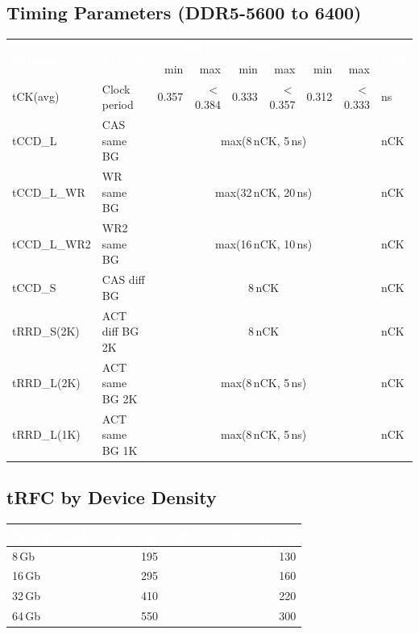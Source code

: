 \documentclass[10pt,a4paper,twoside]{article}
\newcommand{\thd}[1]{\cellcolor{navyblue}\textcolor{white}{\textbf{#1}}}
\newcommand{\thdm}[1]{\cellcolor{steelblue}\textcolor{white}{\small\textbf{#1}}}
\newcommand{\trow}{\rowcolor{lightgray}}
\newcommand{\talt}{\rowcolor{skyblue!30}}
\begin{document}
\subsection{Timing Parameters (DDR5-5600 to 6400)}

\begin{center}
\begin{tabularx}{\linewidth}{@{} l l r r r r r r l @{}}
\toprule
\multirow{2}{*}{\thd{Parameter}} & \multirow{2}{*}{\thd{Symbol}} &
\multicolumn{2}{c}{\thdm{5600}} & \multicolumn{2}{c}{\thdm{6000}} &
\multicolumn{2}{c}{\thdm{6400}} & \multirow{2}{*}{\thd{Unit}} \\
& & min & max & min & max & min & max & \\
\midrule
\trow tCK(avg) & Clock period & 0.357 & $<$0.384 & 0.333 & $<$0.357 & 0.312 & $<$0.333 & ns \\
\talt tCCD\_L & CAS same BG & \multicolumn{6}{c}{max(8\,nCK, 5\,ns)} & nCK \\
\trow tCCD\_L\_WR & WR same BG & \multicolumn{6}{c}{max(32\,nCK, 20\,ns)} & nCK \\
\talt tCCD\_L\_WR2 & WR2 same BG & \multicolumn{6}{c}{max(16\,nCK, 10\,ns)} & nCK \\
\trow tCCD\_S & CAS diff BG & \multicolumn{6}{c}{8\,nCK} & nCK \\
\talt tRRD\_S(2K) & ACT diff BG 2K & \multicolumn{6}{c}{8\,nCK} & nCK \\
\trow tRRD\_L(2K) & ACT same BG 2K & \multicolumn{6}{c}{max(8\,nCK, 5\,ns)} & nCK \\
\talt tRRD\_L(1K) & ACT same BG 1K & \multicolumn{6}{c}{max(8\,nCK, 5\,ns)} & nCK \\
\bottomrule
\end{tabularx}
\end{center}

\subsection{tRFC by Device Density}

\begin{center}
\begin{tabularx}{0.8\linewidth}{@{} l r r @{}}
\toprule
\thd{Density} & \thd{tRFC1 (ns) min} & \thd{tRFC2 (FGR, ns) min} \\
\midrule
\trow 8\,Gb  & 195 & 130 \\
\talt 16\,Gb & 295 & 160 \\
\trow 32\,Gb & 410 & 220 \\
\talt 64\,Gb & 550 & 300 \\
\bottomrule
\end{tabularx}
\end{center}
\end{document}
